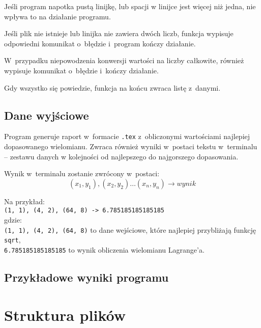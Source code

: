 \documentclass[12pt]{article}
\begin{document}
Jeśli program napotka pustą linijkę, lub spacji w linijce jest więcej niż jedna, nie wpływa to na działanie programu. 

Jeśli plik nie istnieje lub linijka nie zawiera dwóch liczb, funkcja wypisuje odpowiedni komunikat o~błędzie i~program kończy działanie. 

W~przypadku niepowodzenia konwersji wartości na liczby całkowite, również wypisuje komunikat o~błędzie i~kończy działanie.

Gdy wszystko się powiedzie, funkcja na końcu zwraca listę z~danymi.

\subsection{Dane wyjściowe}
Program generuje raport w~formacie \texttt{.tex} z~obliczonymi wartościami najlepiej dopasowanego wielomianu. Zwraca również wyniki w~postaci tekstu w~terminalu – zestawu danych w kolejności od najlepszego do najgorszego dopasowania.

Wynik w~terminalu zostanie zwrócony w~postaci: $$(x_1, y_1), (x_2, y_2)\ldots (x_n, y_n) \rightarrow wynik$$

Na przykład:\\[0.15cm]
\texttt{(1, 1), (4, 2), (64, 8) -> 6.785185185185185}\\

gdzie:\\[0.15cm]\texttt{(1, 1), (4, 2), (64, 8)} to dane wejściowe, które najlepiej przybliżają funkcję \texttt{sqrt},\\[0.15cm]\texttt{6.785185185185185} to wynik obliczenia wielomianu Lagrange'a.

\subsection{Przykładowe wyniki programu}

\section{Struktura plików}
\end{document}
